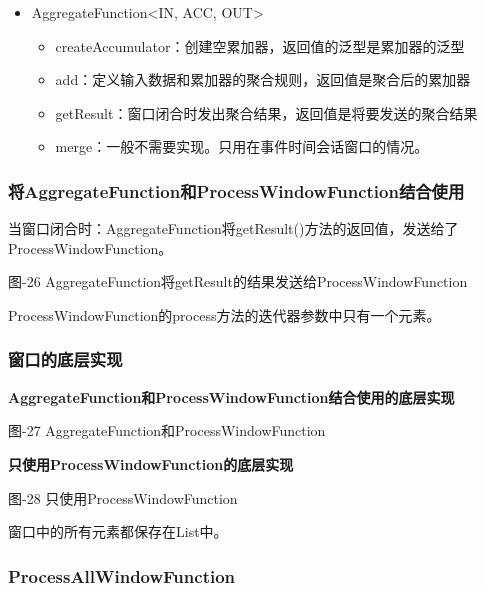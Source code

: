 \begin{itemize}
\tightlist
\item
  AggregateFunction\textless IN, ACC, OUT\textgreater{}

  \begin{itemize}
  \tightlist
  \item
    createAccumulator：创建空累加器，返回值的泛型是累加器的泛型
  \item
    add：定义输入数据和累加器的聚合规则，返回值是聚合后的累加器
  \item
    getResult：窗口闭合时发出聚合结果，返回值是将要发送的聚合结果
  \item
    merge：一般不需要实现。只用在{事件时间会话窗口}的情况。
  \end{itemize}
\end{itemize}

\hypertarget{ux5c06aggregatefunctionux548cprocesswindowfunctionux7ed3ux5408ux4f7fux7528}{%
\subsubsection{将AggregateFunction和ProcessWindowFunction结合使用}\label{ux5c06aggregatefunctionux548cprocesswindowfunctionux7ed3ux5408ux4f7fux7528}}

当窗口闭合时：AggregateFunction将getResult()方法的返回值，发送给了ProcessWindowFunction。

图-26 AggregateFunction将getResult的结果发送给ProcessWindowFunction

ProcessWindowFunction的process方法的迭代器参数中只有一个元素。

\hypertarget{ux7a97ux53e3ux7684ux5e95ux5c42ux5b9eux73b0}{%
\subsubsection{窗口的底层实现}\label{ux7a97ux53e3ux7684ux5e95ux5c42ux5b9eux73b0}}

\textbf{AggregateFunction和ProcessWindowFunction结合使用的底层实现}

图-27 AggregateFunction和ProcessWindowFunction

\textbf{只使用ProcessWindowFunction的底层实现}

图-28 只使用ProcessWindowFunction

窗口中的所有元素都保存在List中。

\hypertarget{processallwindowfunction}{%
\subsubsection{ProcessAllWindowFunction}\label{processallwindowfunction}}

